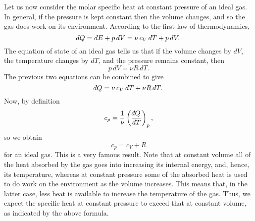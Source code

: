 Let us now consider the molar specific heat at constant pressure of an ideal
gas. In general, if the
pressure is kept constant then the volume changes, and so the gas does work on its
environment. According to the first law of thermodynamics,
\begin{equation}
\dbar Q = dE + p\,dV = \nu\, c_V \,dT + p\, dV.
\end{equation}
The equation of state of an ideal gas tells us that if the
volume changes by $dV$, the temperature changes by $dT$, and the pressure 
remains constant, then 
\begin{equation}
p\,dV = \nu R\,dT.
\end{equation}
The previous two equations can be combined to give
\begin{equation}
\dbar Q = \nu \,c_V \, dT + \nu R\, dT.
\end{equation}
Now, by definition
\begin{equation}
c_p = \frac{1}{\nu}\left(\frac{\dbar Q}{dT}\right)_p,
\end{equation}
so we obtain
\begin{equation}
c_p = c_V + R
\end{equation}
for an ideal gas. This is a very famous result. Note that at constant volume
all of the heat absorbed by the gas goes into increasing its internal energy,
and, hence, its temperature, whereas at constant pressure some of the absorbed
heat is used to do work on the environment as the volume increases. This
means that, in the latter case,
less heat is available to increase the temperature of the gas. 
Thus, we expect the specific heat at constant pressure to exceed that at 
constant volume, as indicated by  the above formula.

